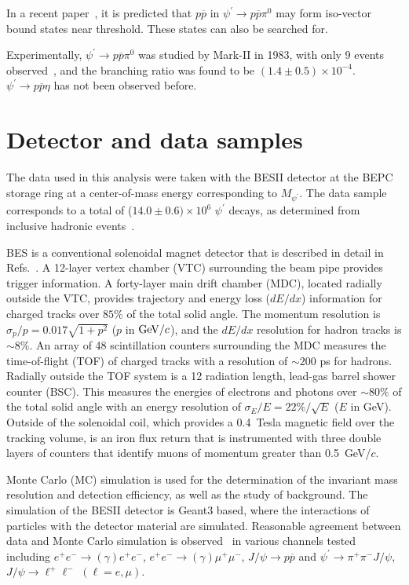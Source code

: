 \documentclass[prd,twocolumn,showpacs,amsmath,amssymb]{revtex4}
\newcommand{\psip}{\psi^\prime}
\newcommand{\jpsi}{J/\psi}
\newcommand{\EE}{e^+e^-}
\newcommand{\MM}{\mu^+\mu^-}
\newcommand{\piz}{\pi^0}
\newcommand{\ppb}{p\overline{p}}
\newcommand{\ppjpsi}{\pi^+\pi^-\jpsi}
\newcommand{\ra}{\rightarrow}
\newcommand{\jpsito}{J/\psi \rightarrow }
\newcommand{\psipto}{\psi^\prime \rightarrow }
\newcommand{\pspto}{\psi^\prime \rightarrow }
\newcommand{\g}{\gamma}
\begin{document}
In a recent paper~\cite{zhangzx}, it is predicted that $\ppb$ in
$\pspto \ppb \piz$ may form iso-vector bound states near
threshold. These states can also be searched for.

Experimentally, $\psipto \ppb \piz$ was studied by Mark-II in
1983, with only 9 events observed~\cite{markii}, and the branching
ratio was found to be $(1.4\pm 0.5) \times 10^{-4}$. $\psipto \ppb
\eta$ has not been observed before.

\section{Detector and data samples}

The data used in this analysis were taken with the BESII detector
at the BEPC storage ring at a center-of-mass energy corresponding
to $M_{\psip}$. The data sample corresponds to a total of ($14.0
\pm 0.6)\times 10^6$ $\psip$ decays, as determined from inclusive
hadronic events~\cite{pspscan}.

BES is a conventional solenoidal magnet detector that is described
in detail in Refs.~\cite{bes,bes2}. A 12-layer vertex chamber
(VTC) surrounding the beam pipe provides trigger information. A
forty-layer main drift chamber (MDC), located radially outside the
VTC, provides trajectory and energy loss ($dE/dx$) information for
charged tracks over $85\%$ of the total solid angle.  The momentum
resolution is $\sigma _p/p = 0.017 \sqrt{1+p^2}$ ($p$ in
$\hbox{GeV}/c$), and the $dE/dx$ resolution for hadron tracks is
$\sim 8\%$. An array of 48 scintillation counters surrounding the
MDC measures the time-of-flight (TOF) of charged tracks with a
resolution of $\sim 200$ ps for hadrons.  Radially outside the TOF
system is a 12 radiation length, lead-gas barrel shower counter
(BSC).  This measures the energies of electrons and photons over
$\sim 80\%$ of the total solid angle with an energy resolution of
$\sigma_E/E=22\%/\sqrt{E}$ ($E$ in GeV). Outside of the solenoidal
coil, which provides a 0.4~Tesla magnetic field over the tracking
volume, is an iron flux return that is instrumented with three
double layers of counters that identify muons of momentum greater
than 0.5~GeV/$c$.

Monte Carlo (MC) simulation is used for the determination of the
invariant mass resolution and detection efficiency, as well as the
study of background. The simulation of the BESII detector is
Geant3 based, where the interactions of particles with the
detector material are simulated. Reasonable agreement between data
and Monte Carlo simulation is observed~\cite{simbes} in various
channels tested including $\EE \ra (\g)\EE$, $\EE\ra (\g)\MM$,
$\jpsito \ppb$ and $\psipto \ppjpsi$, $\jpsito \ell^+\ell^-$
$(\ell=e,\mu)$.
\end{document}
